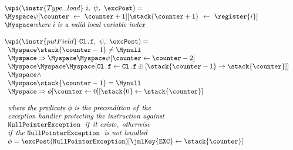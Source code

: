 \begin{figure}[ht]

$$
\begin{array}{l}
\wpi(\instr{Type\_load} \ i, \ \psi, \ \excPost) =  \\
\Myspace \psi[\counter \ \leftarrow \ \counter+1] [\stack{\counter+1} \ \leftarrow \ \register{i}] \\
 \Myspace \textit{where} \ i \ \textit{is a valid local variable index}   \\
\\ 
\wpi(\instr{putField} \ \texttt{Cl.f}, \ \psi, \ \excPost) = \\
\begin{array}{l}
   	\Myspace	\stack{\counter -1} \not= \Mynull \\
	\Myspace	\Rightarrow  
	\Myspace		%
	\Myspace	 \psi [\counter \leftarrow \counter-2 ] \\[0 mm] 
   		\Myspace\Myspace\Myspace[\texttt{Cl.f} \leftarrow \texttt{Cl.f}\oplus [\stack{\counter -1} \rightarrow \stack{\counter}] ] \\
   \Myspace	\wedge \\
   \Myspace	\stack{\counter-1} = \Mynull \\
 \Myspace	\Rightarrow  \phi[ \counter \leftarrow  0][\stack{0} \leftarrow \stack{\counter}]  \\		  \\
   \it{where \ the \ predicate \ \phi \  is \ the \ precondition \ of \ the} \\
   \it{exception \ handler \ protecting \ the \ instruction \  against} \\ 
   \tt{NullPointerException } \ \it{\ if \ it \  exists, \ otherwise}  \\
   \it{if \ the } \ \tt{ NullPointerException} \ \it{\ is \ not \ handled}    \\
      \phi = \excPost(\tt{NullPointerException})[ \jmlKey{EXC} \leftarrow \stack{\counter}]
    \end{array}
 \end{array} $$




\end{figure}
